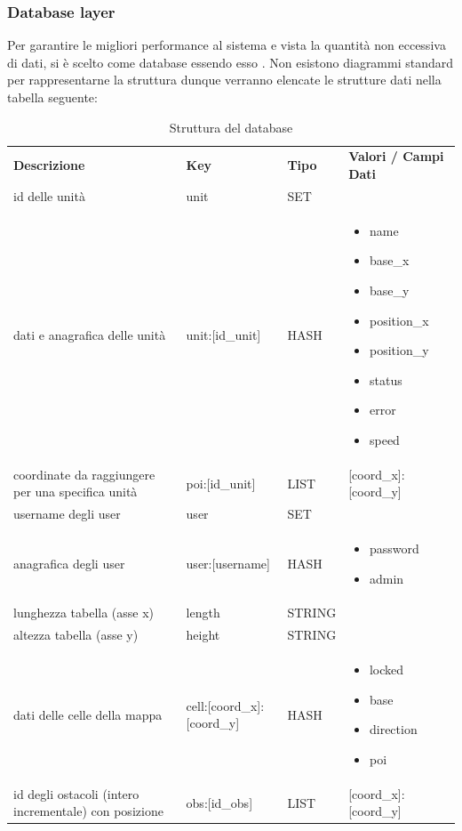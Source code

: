	\subsubsection{Database layer}
		Per garantire le migliori performance al sistema e vista la quantità non eccessiva di dati, si è scelto  come database essendo esso . Non esistono diagrammi standard per rappresentarne la struttura dunque verranno elencate le strutture dati nella tabella seguente:

		\begin{table} [h!]
			\begin{center}
				\begin{tabular} { m{6cm} m{4cm} m{2cm} m{4cm}}
					\rowcolor{lightgray}
					\textbf{Descrizione} & \textbf{Key} & \textbf{Tipo} & \textbf{Valori / Campi Dati}\\
					id delle unità & unit & SET & \\
					dati e anagrafica delle unità & unit:[id\_unit] & HASH &
						\begin{itemize}
							\item name
							\item base\_x
							\item base\_y
							\item position\_x
							\item position\_y
							\item status
							\item error
							\item speed
						\end{itemize}\\
					coordinate \glock{POI} da raggiungere per una specifica unità & poi:[id\_unit] & LIST & [coord\_x]:[coord\_y]\\
					username degli user & user & SET & \\
					anagrafica degli user & user:[username] & HASH &
						\begin{itemize}
							\item password
							\item admin
						\end{itemize}\\
					lunghezza tabella (asse x) & length & STRING & \\
					altezza tabella (asse y) & height & STRING & \\
					dati delle celle della mappa & cell:[coord\_x]:[coord\_y] & HASH &
						\begin{itemize}
							\item locked
							\item base
							\item direction
							\item poi
						\end{itemize}\\
					id degli ostacoli (intero incrementale) con posizione & obs:[id\_obs] & LIST & [coord\_x]:[coord\_y]\\
				\end{tabular}
				\caption{Struttura del database }
			\end{center}
		\end{table}

